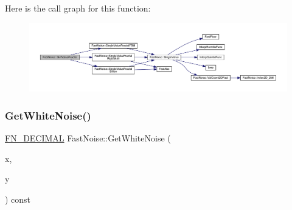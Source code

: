 Here is the call graph for this function\+:
\nopagebreak
\begin{figure}[H]
\begin{center}
\leavevmode
\includegraphics[width=350pt]{d1/dd8/class_fast_noise_a972ef8f462048015489604783155fd17_cgraph}
\end{center}
\end{figure}
\mbox{\label{class_fast_noise_aaf5a3c39b9e95d064690711852fb7fbf}} 
\subsubsection{\texorpdfstring{Get\+White\+Noise()}{GetWhiteNoise()}\hspace{0.1cm}{\footnotesize\ttfamily [1/3]}}
{\footnotesize\ttfamily \mbox{\hyperlink{_fast_noise_8h_a75a9ef6d2541c4921815b885bfd449c3}{F\+N\+\_\+\+D\+E\+C\+I\+M\+AL}} Fast\+Noise\+::\+Get\+White\+Noise (\begin{DoxyParamCaption}\item[{\mbox{\hyperlink{_fast_noise_8h_a75a9ef6d2541c4921815b885bfd449c3}{F\+N\+\_\+\+D\+E\+C\+I\+M\+AL}}}]{x,  }\item[{\mbox{\hyperlink{_fast_noise_8h_a75a9ef6d2541c4921815b885bfd449c3}{F\+N\+\_\+\+D\+E\+C\+I\+M\+AL}}}]{y }\end{DoxyParamCaption}) const}

